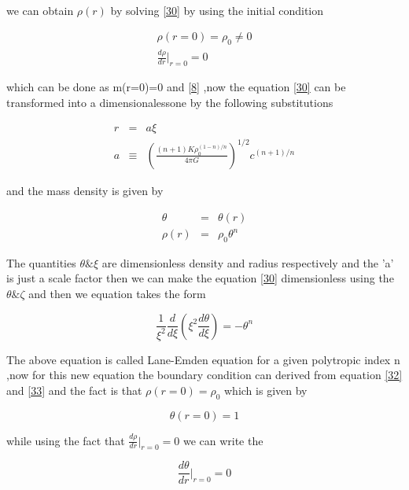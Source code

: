 \documentclass{report}
\begin{document}
\paragraph{ }
we can obtain $\rho(r)$ by solving \ref{30} by using the initial condition 
\begin{center}
\begin{eqnarray}
\rho(r=0) = \rho_0 \neq 0 \\
\label{32}
\frac{d\rho}{dr}|_{r=0} = 0
\label{33}
\end{eqnarray}
\end{center}
which can be done as m(r=0)=0 and \ref{8} ,now the equation \ref{30} can be transformed into a dimensionalessone by the following substitutions 
\begin{center}
\begin{eqnarray}
r&=&a\xi \nonumber \\
a & \equiv & \left( \frac{(n+1)K\rho_0 ^{(1-n)/n}}{4\pi G} \right) ^{1/2} c^{(n+1)/n} 
\label{34}
\end{eqnarray} 
\end{center}
and the mass density is given by 
\begin{center}
\begin{eqnarray}
\theta &=& \theta(r) \nonumber \\
\rho(r) &=&  \rho_0 \theta^n 
\label{35}
\end{eqnarray}
\end{center}
The quantities  $\theta \& \xi $ are dimensionless density and radius respectively and the 'a' is just a scale factor then we can make the  equation \ref{30} dimensionless using the $\theta \& \zeta$ and then we equation takes the form
\begin{center}
\begin{equation}
\frac{1}{\xi^2} \frac{d}{d\xi}\left( \xi^2 \frac{d\theta}{d\xi} \right) = -\theta^n 
\label{36}
\end{equation}
\end{center}
The above equation is called Lane-Emden equation for a given polytropic index n ,now for this new equation the boundary condition can derived from equation \ref{32} and \ref{33} and the fact is that $\rho(r=0)=\rho_0$ which is given by 
\begin{center}
\begin{equation}
\theta(r=0) = 1 
\label{37}
\end{equation}
\end{center}
while using the fact that $\frac{d\rho}{dr}|_{r=0} = 0 $ we can write the 
\begin{center}
\begin{equation}
\frac{d\theta}{dr} \vert_{r=0} =0
\label{38}
\end{equation}
\end{center}
\newpage
\end{document}
